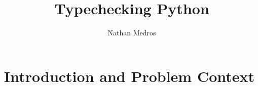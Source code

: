 \documentclass[10pt,twocolumn]{article}
\title{Typechecking Python}
\author{Nathan Medros}
\affiliation{Occidental College}
\begin{document}
\maketitle

\section{Introduction and Problem Context}

\end{document}
